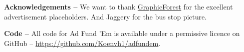 \documentclass[letterpaper, twocolumn]{article}
\begin{document}
	\textbf{Acknowledgements --}\label{sec:acknowledgements}
	We want to thank \href{https://www.freepik.com/author/graphicforest}{GraphicForest} for the excellent advertisement placeholders. And Jaggery for the bus stop picture.
	
	\textbf{Code --}
	All code for Ad Fund 'Em is available under a permissive licence on GitHub -- \url{https://github.com/Koenvh1/adfundem}.
	
	
	
	
	 
	
	
\end{document}
